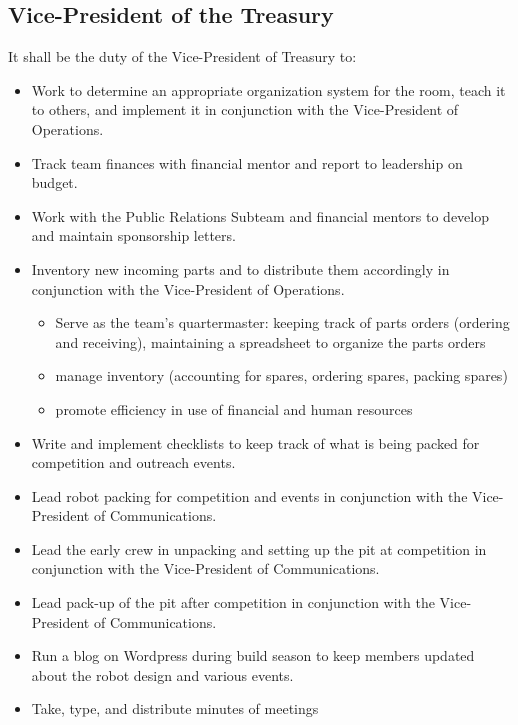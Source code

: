 \documentclass[12pt, a4paper]{article}
\begin{document}
\subsection{Vice-President of the Treasury}
It shall be the duty of the Vice-President of Treasury to:
\begin{itemize}
\item Work to determine an appropriate organization system for the room, teach it to others, and implement it in conjunction with the Vice-President of Operations.
\item Track team finances with financial mentor and report to leadership on budget.
\item Work with the Public Relations Subteam and financial mentors to develop and maintain sponsorship letters.  
\item Inventory new incoming parts and to distribute them accordingly in conjunction with the Vice-President of Operations.
	\begin{itemize}
	\item Serve as the team’s quartermaster: keeping track of parts orders (ordering and receiving), maintaining a spreadsheet to 	organize the parts orders
	\item manage inventory (accounting for spares, ordering spares, packing spares)
	\item promote efficiency in use of financial and human resources
\end{itemize}
\item Write and implement checklists to keep track of what is being packed for competition and outreach events.
\item Lead robot packing for competition and events in conjunction with the Vice-President of Communications.
\item Lead the early crew in unpacking and setting up the pit at competition in conjunction with the Vice-President of Communications.
\item Lead pack-up of the pit after competition in conjunction with the Vice-President of Communications.
\item Run a blog on Wordpress during build season to keep members updated about the robot design and various events.
\item Take, type, and distribute minutes of meetings
\end{itemize}
\end{document}
